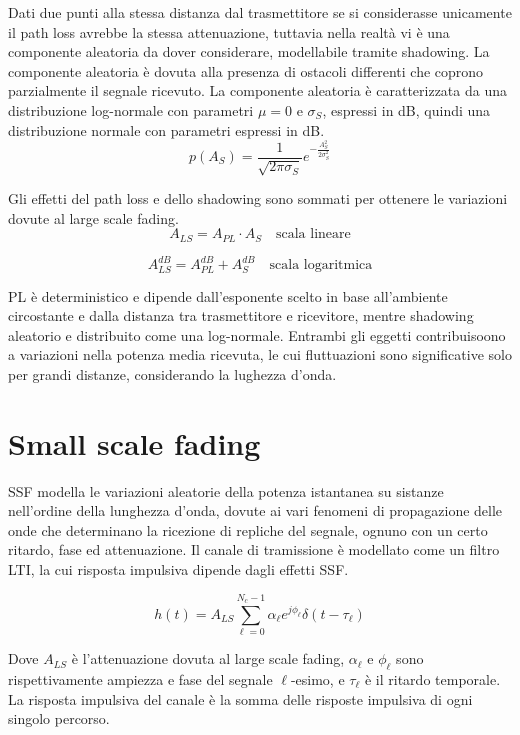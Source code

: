 Dati due punti alla stessa distanza dal trasmettitore se si considerasse unicamente il path loss avrebbe la stessa attenuazione, tuttavia nella realtà vi è una componente aleatoria da dover considerare, modellabile tramite shadowing. La componente aleatoria è dovuta alla presenza di ostacoli differenti che coprono parzialmente il segnale ricevuto. La componente aleatoria è caratterizzata da una distribuzione log-normale con parametri $\mu = 0$ e $\sigma_S$, espressi in dB, quindi una distribuzione normale con parametri espressi in dB.
\begin{equation}
    p(A_S) = \frac{1}{\sqrt{2\pi \sigma_S}} e^{-\frac{A_S^2}{2\sigma_S^2}}
\end{equation}




Gli effetti del path loss e dello shadowing sono sommati per ottenere le variazioni dovute al large scale fading. 
\[
    A_{LS} = A_{PL} \cdot A_S \quad \text{scala lineare}
\]

\[
    A_{LS}^{dB} = A_{PL}^{dB} + A_S^{dB} \quad \text{scala logaritmica}
\]


PL è deterministico e dipende dall'esponente scelto in base all'ambiente circostante e dalla distanza tra trasmettitore e ricevitore, mentre shadowing aleatorio e distribuito come una log-normale. Entrambi gli eggetti contribuisoono a variazioni nella potenza media ricevuta, le cui fluttuazioni sono significative solo per grandi distanze, considerando la lughezza d'onda.



\section*{Small scale fading}

SSF modella le variazioni aleatorie della potenza istantanea su sistanze nell'ordine della lunghezza d'onda, dovute ai vari fenomeni di propagazione delle onde che determinano la ricezione di repliche del segnale, ognuno con un certo ritardo, fase ed attenuazione. Il canale di tramissione è modellato come un filtro LTI, la cui risposta impulsiva dipende dagli effetti SSF.

\[
    h(t) = A_{LS} \sum_{\ell=0}^{N_c-1} \alpha_{\ell} e^{j\phi_{\ell}} \delta(t - \tau_{\ell})
\]

Dove \( A_{LS} \) è l'attenuazione dovuta al large scale fading, \( \alpha_{\ell} \) e \( \phi_{\ell} \) sono rispettivamente ampiezza e fase del segnale \(\ell\)-esimo, e \( \tau_{\ell} \) è il ritardo temporale. La risposta impulsiva del canale è la somma delle risposte impulsiva di ogni singolo percorso.

